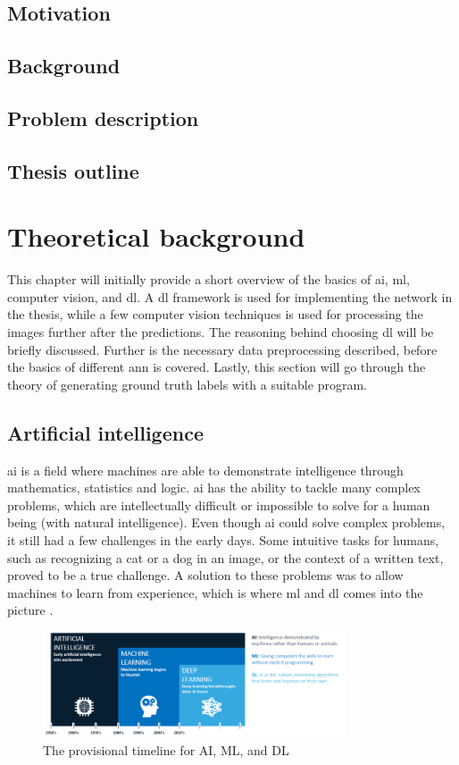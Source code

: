 \documentclass[USenglish]{ifimaster}  %
\begin{document}
\section{Motivation}
\section{Background}
\section{Problem description}
\section{Thesis outline}

\chapter{Theoretical background}
This chapter will initially provide a short overview of the basics of \ac{ai}, \ac{ml}, computer vision, and \acf{dl}. A \ac{dl} framework is used for implementing the network in the thesis, while a few computer vision techniques is used for processing the images further after the predictions. The reasoning behind choosing \ac{dl} will be briefly discussed. Further is the necessary data preprocessing described, before the basics of different \ac{ann} is covered. Lastly, this section will go through the theory of generating ground truth labels with a suitable program.

\section{Artificial intelligence}
\ac{ai} is a field where machines are able to demonstrate intelligence through mathematics, statistics and logic. \ac{ai} has the ability to tackle many complex problems, which are intellectually difficult or impossible to solve for a human being (with natural intelligence). Even though \ac{ai} could solve complex problems, it still had a few challenges in the early days. Some intuitive tasks for humans, such as recognizing a cat or a dog in an image, or the context of a written text, proved to be a true challenge. A solution to these problems was to allow machines to learn from experience, which is where \ac{ml} and \ac{dl} comes into the picture \cite{The_holy_grail_of_DL}.

\begin{figure}[ht]
    \centering
    \includegraphics[width=0.8\textwidth]{bilder/AI_ML_DL.png}
    \caption{The provisional timeline for AI, ML, and DL \cite{website:AI}}
    \label{fig:AI}
\end{figure}
\end{document}
